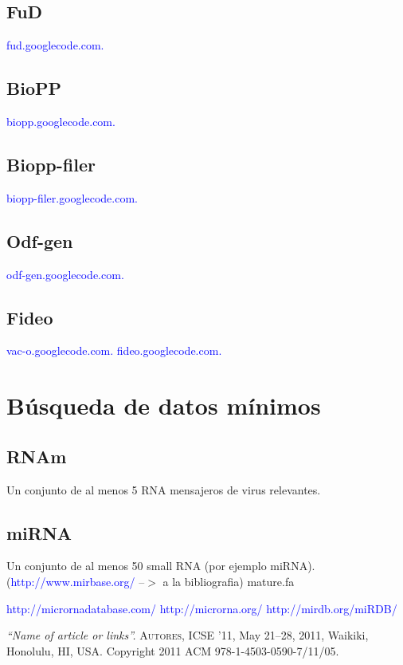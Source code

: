 \documentclass[12pt,a4paper,spanish]{article}
\begin{document}
		
		

	\subsection{FuD}
		 \textcolor{blue}{fud.googlecode.com.}

	\subsection{BioPP}
		 \textcolor{blue}{biopp.googlecode.com.}

	\subsection{Biopp-filer}
		 \textcolor{blue}{biopp-filer.googlecode.com.}

	\subsection{Odf-gen}
		 \textcolor{blue}{odf-gen.googlecode.com.}

	\subsection{Fideo}
		  \textcolor{blue}{vac-o.googlecode.com.} \textcolor{blue}{fideo.googlecode.com.}


\section{Búsqueda de datos mínimos}
	\subsection{RNAm}
		\par Un conjunto de al menos 5 RNA mensajeros de virus relevantes.
	\subsection{miRNA}
		\par Un conjunto de al menos 50 small RNA (por ejemplo miRNA). (\textcolor{blue}{http://www.mirbase.org/} --$>$ a la bibliografia) mature.fa

	\textcolor{blue}{http://micrornadatabase.com/}
	\textcolor{blue}{http://microrna.org/}
	\textcolor{blue}{http://mirdb.org/miRDB/}

\begin{thebibliography}{99}
\small	{} {\em{“Name of article or links”}.}
			\textsc{Autores}, ICSE ’11, May 21–28, 2011, Waikiki, Honolulu, HI, USA. Copyright 2011 ACM 978-1-4503-0590-7/11/05.
\end{thebibliography}
\end{document}
